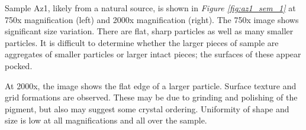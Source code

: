 
Sample Az1, likely from a natural source, is shown in \textit{Figure \ref{fig:az1_sem_1}} at 750x magnification (left) and 2000x magnification (right). The 750x image shows significant size variation. There are flat, sharp particles as well as many smaller particles. It is difficult to determine whether the larger pieces of sample are aggregates of smaller particles or larger intact pieces; the surfaces of these appear pocked.

At 2000x, the image shows the flat edge of a larger particle. Surface texture and grid formations are observed. These may be due to grinding and polishing of the pigment, but also may suggest some crystal ordering. Uniformity of shape and size is low at all magnifications and all over the sample.

